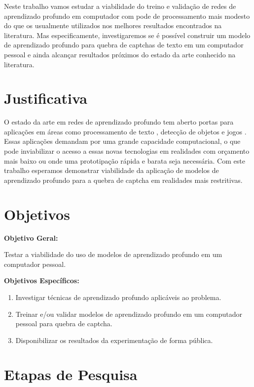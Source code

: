 \documentclass[openany, a4paper,12pt, oneside]{article}
\begin{document}
Neste trabalho vamos estudar a viabilidade do treino e validação de redes de aprendizado profundo em computador com pode de processamento mais modesto do que os usualmente utilizados nos melhores resultados encontrados na literatura.
Mas especificamente, investigaremos se é possível construir um modelo de aprendizado profundo
para quebra de captchas de texto em um computador pessoal e ainda alcançar
resultados próximos do estado da arte conhecido na literatura.

\section{Justificativa}

O estado da arte em redes de aprendizado profundo tem aberto portas para aplicações em áreas como processamento de texto \cite{word2vec_2013},
detecção de objetos \cite{Redmon2017YOLO9000BF} e
jogos \cite{mnih2015humanlevel, alphagozero_2017}. Essas aplicações
demandam por uma grande capacidade computacional, o que pode inviabilizar o acesso
a essas novas tecnologias em realidades com orçamento mais baixo ou onde uma prototipação rápida e barata seja necessária. Com este trabalho esperamos demonstrar viabilidade da aplicação de modelos de aprendizado profundo para a quebra de captcha em realidades mais restritivas.

\section{Objetivos}
\textbf{Objetivo Geral:\\}

Testar a viabilidade do uso de modelos de aprendizado profundo 
em um computador pessoal.

\textbf{Objetivos Específicos:\\}
\begin{enumerate}
	\item Investigar técnicas de aprendizado profundo aplicáveis ao problema.
	\item Treinar e/ou validar modelos de aprendizado profundo em um computador pessoal para quebra de captcha.
	\item Disponibilizar os resultados da experimentação de forma pública.
\end{enumerate}

\section{Etapas de Pesquisa}
\end{document}
